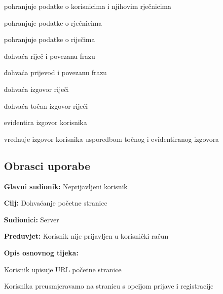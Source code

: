 \begin{packed_enum}
				\item {}
				\begin{packed_enum}
					\item pohranjuje podatke o korisnicima i njihovim rječnicima
					\item pohranjuje podatke o rječnicima
					\item pohranjuje podatke o riječima
				\end{packed_enum}
				
				\item {}
				\begin{packed_enum}
					\item dohvaća riječ i povezanu frazu
					\item dohvaća prijevod i povezanu frazu
					\item dohvaća izgovor riječi
				\end{packed_enum}
				
				\item {}
				\begin{packed_enum}
					\item dohvaća točan izgovor riječi
					\item evidentira izgovor korisnika
					\item vrednuje izgovor korisnika usporedbom točnog i evidentiranog izgovora
				\end{packed_enum}
				
			\end{packed_enum}
			
			\eject 
			
			
				
			\subsection{Obrasci uporabe}

					\noindent {}
					\begin{packed_item}
						\item \textbf{Glavni sudionik:} Neprijavljeni korisnik
						\item \textbf{Cilj:} Dohvaćanje početne stranice
						\item \textbf{Sudionici:} Server
						\item \textbf{Preduvjet:} Korisnik nije prijavljen u korisnički račun
						\item \textbf{Opis osnovnog tijeka:}
						\begin{packed_enum}
							\item Korisnik upisuje URL početne stranice
							\item Korisnika preusmjeravamo na stranicu s opcijom prijave i registracije
						\end{packed_enum}
					\end{packed_item}

